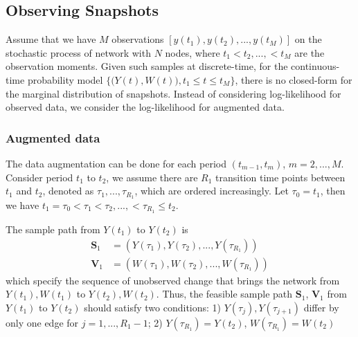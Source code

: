 \documentclass[10pt,letterpaper]{article}
\numberwithin{table}{section}
\numberwithin{figure}{section}
\numberwithin{equation}{section}
\newcommand\independent{\protect\mathpalette{\protect\independenT}{\perp}}
\def\independenT#1#2{\mathrel{\rlap{$#1#2$}\mkern2mu{#1#2}}}
\begin{document}

\subsection{Observing Snapshots}
Assume that we have $M$ observations $[y(t_1), y(t_2),...,y(t_M)]$ on the stochastic process of network with $N$ nodes, where $t_1< t_2,...,<t_M$ are the observation moments. 
Given such samples at discrete-time, for the continuous-time probability model $\{\big(Y(t),W(t)\big), t_1 \leq t\leq t_M\}$, there is no closed-form for the marginal distribution of snapshots. Instead of considering log-likelihood for observed data, we consider the log-likelihood for augmented data. 


\subsubsection{Augmented data}
The data augmentation can be done for each period $(t_{m-1}, t_m)$, $m=2,...,M$. Consider period $t_1$ to $t_2$, we assume there are $R_1$ transition time points between $t_1$ and $t_2$, denoted as $\tau_1,...,\tau_{R_1}$, which are ordered increasingly. Let $\tau_0 = t_1$, then we have $t_1=\tau_0<\tau_1<\tau_2,...,<\tau_{R_1} \leq t_2$.

The sample path from $Y(t_1)$ to $Y(t_2)$ is 
\begin{equation}
\begin{split}
\bm S_1 &= (Y(\tau_1), Y(\tau_2),...,Y(\tau_{R_1}))\\
\bm V_1 &= (W(\tau_1), W(\tau_2),...,W(\tau_{R_1}))
\end{split}
\end{equation} 
which specify the sequence of unobserved change that brings the network from $Y(t_1), W(t_1)$ to $Y(t_2), W(t_2)$. Thus, the feasible sample path $\bm S_1$, $\bm V_1$ from $Y(t_1)$ to $Y(t_2)$ should satisfy two conditions: 1) $Y(\tau_j), Y(\tau_{j+1})$ differ by only one edge for $j=1,...,R_1-1$; 2) $Y(\tau_{R_1}) = Y(t_2)$, $W(\tau_{R_1}) = W(t_2)$
\end{document}
